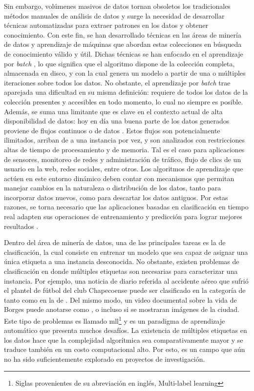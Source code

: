 Sin embargo, volúmenes masivos de datos tornan obsoletos los tradicionales
métodos manuales de análisis de datos y surge la necesidad de desarrollar
técnicas automatizadas para extraer patrones en los datos y obtener
conocimiento. Con este fin, se han desarrollado técnicas en las áreas de minería
de datos y aprendizaje de máquinas que abordan estas colecciones en búsqueda de
conocimiento válido y útil. Dichas técnicas se han enfocado en el aprendizaje
por \textit{batch} \cite{gama_knowledge_2010}, lo que significa que el algoritmo
dispone de la colección completa, almacenada en disco, y con la cual genera un
modelo a partir de una o múltiples iteraciones sobre todos los datos. No
obstante, el aprendizaje por \textit{batch} trae aparejada una dificultad en su
misma definición: requiere de todos los datos de la colección presentes y
accesibles en todo momento,  lo cual no siempre es posible. Además, se suma una
limitante que es clave en el contexto actual de alta disponibilidad de datos:
hoy en día una buena parte de los datos generados proviene de flujos continuos o
 de datos \cite{bifet_big_2014}. Estos flujos son
potencialmente ilimitados, arriban de a una instancia por vez, y son analizados
con restricciones altas de tiempo de procesamiento y de memoria.  Tal es el caso
para aplicaciones de sensores, monitoreo de redes y administración de tráfico,
flujo de clics de un usuario en la web, redes sociales, entre otros.  Los
algoritmos de aprendizaje que actúen en este entorno dinámico deben contar con
mecanismos que permitan manejar cambios en la naturaleza o distribución de los
datos, tanto para incorporar datos nuevos, como para descartar los datos
antiguos. Por estas razones, se torna necesario que las aplicaciones basadas en
clasificación en tiempo real adapten sus operaciones de entrenamiento y
predicción para lograr mejores resultados \cite{sousa_multi-label_2018}.

Dentro del área de minería de datos, una de las principales tareas es la de
clasificación, la cual consiste en entrenar un modelo que sea capaz de asignar
una única etiqueta a una instancia desconocida. No obstante, existen problemas
de clasificación en donde múltiples etiquetas son necesarias para caracterizar
una instancia. Por ejemplo, una noticia de diario referida al accidente aéreo
que sufrió el plantel de fútbol del club Chapecoense puede ser clasificado en la
categoría de  tanto como en la de . Del
mismo modo, un video documental sobre la vida de Borges puede anotarse como
,  o incluso  si
se mostraran imágenes de la ciudad. Este tipo de problemas es llamado
\acrfull{mll}\footnote{Siglas provenientes de su abreviación en inglés,
	Multi-label learning} y es un paradigma de aprendizaje automático que presenta
muchos desafíos. La existencia de múltiples etiquetas en los datos hace que la
complejidad algorítmica sea comparativamente mayor y se traduce también en un
costo computacional alto. Por esto, es un campo que aún no ha sido
suficientemente explorado en proyectos de investigación.

